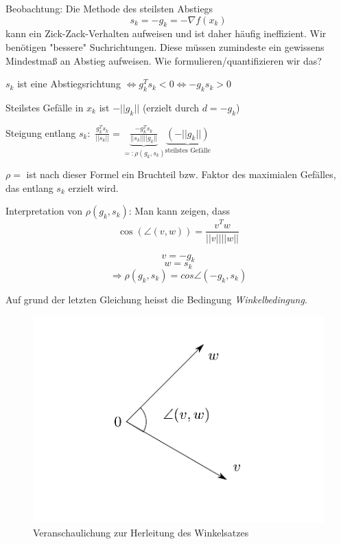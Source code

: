 \documentclass[10pt,a4paper]{article}
\begin{document}

Beobachtung: Die Methode des steilsten Abstiegs $$s_k = -g_k = - \nabla f(x_k)$$ kann ein Zick-Zack-Verhalten aufweisen und ist daher häufig ineffizient. Wir benötigen "bessere" Suchrichtungen. Diese müssen zumindeste ein gewissens Mindestmaß an Abstieg aufweisen. Wie formulieren/quantifizieren wir das?

$s_k$ ist eine Abstiegsrichtung $\Leftrightarrow g_k^{T}s_k <0 \Leftrightarrow -g_ks_k > 0$

Steilstes Gefälle in $x_k$ ist $-||g_k||$ (erzielt durch $d=-g_k$)

Steigung entlang $s_k: $ $\frac{g_k^{T}s_k}{||s_k||}=\underbrace{\frac{-g_k^{T}s_k}{||s_k||||g_k||}}_{=: \rho(g_k, s_k)} \underbrace{(-||g_k||)}_{\text{steilstes Gefälle}}$

$\rho = $ ist nach dieser Formel ein Bruchteil bzw. Faktor des maximialen Gefälles, das entlang $s_k$ erzielt wird.

Interpretation von $\rho(g_k,s_k)$:
Man kann zeigen, dass $$\cos(\angle (v,w)) = \frac{v^{T}w}{||v||||w||}$$

 $$v=-g_k$$ $$w=s_k $$ $$\Rightarrow \rho(g_k,s_k)=cos\angle (-g_k,s_k)$$


Auf grund der letzten Gleichung heisst die Bedingung \emph{Winkelbedingung}.
\begin{figure}[H]
\includegraphics[width=\textwidth]{images/winkel}
\caption{Veranschaulichung zur Herleitung des Winkelsatzes}
\end{figure}
\end{document}
